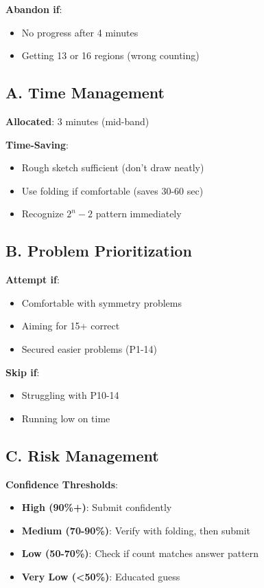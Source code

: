 \documentclass[]{article}
\begin{document}
\begin{solutionbox}
\textbf{Abandon if}:
\begin{itemize}[nosep]
    \item No progress after 4 minutes
    \item Getting 13 or 16 regions (wrong counting)
\end{itemize}
\end{solutionbox}

\begin{competitionbox}
\subsection*{A. Time Management}

\textbf{Allocated}: 3 minutes (mid-band)

\textbf{Time-Saving}:
\begin{itemize}[nosep]
    \item Rough sketch sufficient (don't draw neatly)
    \item Use folding if comfortable (saves 30-60 sec)
    \item Recognize $2^n - 2$ pattern immediately
\end{itemize}

\subsection*{B. Problem Prioritization}

\textbf{Attempt if}:
\begin{itemize}[nosep]
    \item Comfortable with symmetry problems
    \item Aiming for 15+ correct
    \item Secured easier problems (P1-14)
\end{itemize}

\textbf{Skip if}:
\begin{itemize}[nosep]
    \item Struggling with P10-14
    \item Running low on time
\end{itemize}

\subsection*{C. Risk Management}

\textbf{Confidence Thresholds}:
\begin{itemize}[leftmargin=*]
    \item \textbf{High (90\%+)}: Submit confidently
    \item \textbf{Medium (70-90\%)}: Verify with folding, then submit
    \item \textbf{Low (50-70\%)}: Check if count matches answer pattern
    \item \textbf{Very Low (<50\%)}: Educated guess
\end{itemize}


\end{competitionbox}
\end{document}

